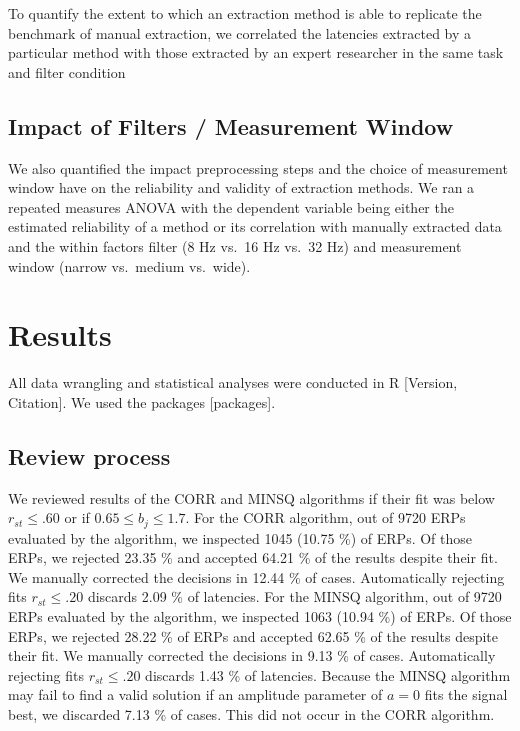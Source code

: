 \documentclass[
  man,floatsintext]{apa7}
\begin{document}
To quantify the extent to which an extraction method is able to replicate the benchmark of manual extraction, we correlated the latencies extracted by a particular method with those extracted by an expert researcher in the same task and filter condition

\hypertarget{impact-of-filters-measurement-window}{%
\subsection{Impact of Filters / Measurement Window}\label{impact-of-filters-measurement-window}}

We also quantified the impact preprocessing steps and the choice of measurement window have on the reliability and validity of extraction methods. We ran a repeated measures ANOVA with the dependent variable being either the estimated reliability of a method or its correlation with manually extracted data and the within factors filter (8 Hz vs.~16 Hz vs.~32 Hz) and measurement window (narrow vs.~medium vs.~wide).

\hypertarget{results}{%
\section{Results}\label{results}}

All data wrangling and statistical analyses were conducted in R {[}Version, Citation{]}. We used the packages {[}packages{]}.

\hypertarget{review-process}{%
\subsection{Review process}\label{review-process}}

We reviewed results of the CORR and MINSQ algorithms if their fit was below \(r_{st} \le .60\) or if \(0.65 \le b_j \le 1.7\). For the CORR algorithm, out of 9720 ERPs evaluated by the algorithm, we inspected 1045 (10.75 \%) of ERPs. Of those ERPs, we rejected 23.35 \% and accepted 64.21 \% of the results despite their fit. We manually corrected the decisions in 12.44 \% of cases. Automatically rejecting fits \(r_{st} \le .20\) discards 2.09 \% of latencies. For the MINSQ algorithm, out of 9720 ERPs evaluated by the algorithm, we inspected 1063 (10.94 \%) of ERPs. Of those ERPs, we rejected 28.22 \% of ERPs and accepted 62.65 \% of the results despite their fit. We manually corrected the decisions in 9.13 \% of cases. Automatically rejecting fits \(r_{st} \le .20\) discards 1.43 \% of latencies. Because the MINSQ algorithm may fail to find a valid solution if an amplitude parameter of \(a = 0\) fits the signal best, we discarded 7.13 \% of cases. This did not occur in the CORR algorithm.
\end{document}
